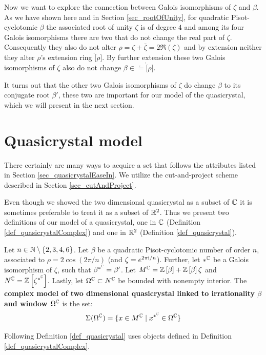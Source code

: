\documentclass[text.tex]{subfiles}
\begin{document}
Now we want to explore the connection between Galois isomorphisms of $\zeta$ and $\beta$. As we have shown here and in Section \ref{sec_rootOfUnity}, for quadratic Pisot-cyclotomic $\beta$ the associated root of unity $\zeta$ is of degree $4$ and among its four Galois isomorphisms there are two that do not change the real part of $\zeta$. Consequently they also do not alter $\rho = \zeta +\bar{\zeta} = 2\Re{(\zeta)}$ and by extension neither they alter $\rho$'s extension ring $\ring[\rho]$. By further extension these two Galois isomorphisms of $\zeta$ also do not change $\beta\in\ring=\ring[\rho]$. 

It turns out that the other two Galois isomorphisms of $\zeta$ do change $\beta$ to its conjugate root $\beta'$, these two are important for our model of the quasicrystal, which we will present in the next section. 

\section{Quasicrystal model}%
There certainly are many ways to acquire a set that follows the attributes listed in Section \ref{sec_quasicrystalEaseIn}. We utilize the cut-and-project scheme described in Section \ref{sec_cutAndProject}. 

Even though we showed the two dimensional quasicrystal as a subset of $\mathbb{C}$ it is sometimes preferable to treat it as a subset of $\mathbb{R}^2$. Thus we present two definitions of our model of a quasicrystal, one in $\mathbb{C}$ (Definition \ref{def_quasicrystalComplex}) and one in $\mathbb{R}^2$ (Definition \ref{def_quasicrystal}). 

\begin{definition}\label{def_quasicrystalComplex}
Let $n\in\mathbb{N}\setminus\{2,3,4,6\}$. Let $\beta$ be a quadratic Pisot-cyclotomic number of order $n$, associated to $\rho = 2\cos\left(2\pi/n\right)$ (and $\zeta = e^{2\pi \mathrm{i}/n}$). 
Further, let $\ast^{\mathbb{C}}$ be a Galois isomorphism of $\zeta$, such that $\beta^{\ast^{\mathbb{C}}} = \beta'$. 
Let  $M^{\mathbb{C}} = \mathbb{Z}\left[\beta\right]+\mathbb{Z}\left[\beta\right]\zeta$ and $N^{\mathbb{C}}=\mathbb{Z}\left[\zeta^{\ast^{\mathbb{C}}}\right]$.
Lastly, let $\Omega^{\mathbb{C}}\subset N^{\mathbb{C}}$ be bounded with nonempty interior. 
The \textbf{complex model of two dimensional quasicrystal linked to irrationality $\beta$ and window $\Omega^{\mathbb{C}}$} is the set:
$$\Sigma(\Omega^{\mathbb{C}}) = \{ x \in M^{\mathbb{C}}\; |\; x^{\ast^{\mathbb{C}}}\in \Omega^{\mathbb{C}}\}$$
\end{definition}

Following Definition \ref{def_quasicrystal} uses objects defined in Definition \ref{def_quasicrystalComplex}. 
\end{document}
